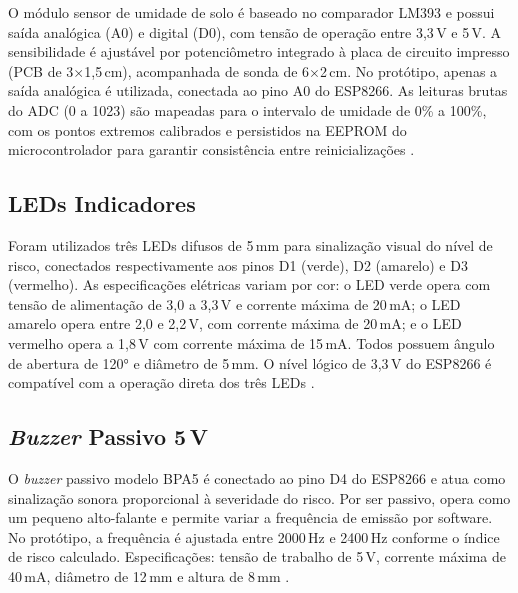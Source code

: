 O módulo sensor de umidade de solo é baseado no comparador LM393 e
possui saída analógica (A0) e digital (D0), com tensão de operação
entre 3,3\,V e 5\,V. A sensibilidade é ajustável por potenciômetro
integrado à placa de circuito impresso (PCB de 3$\times$1,5\,cm),
acompanhada de sonda de 6$\times$2\,cm. No protótipo, apenas a saída
analógica é utilizada, conectada ao pino A0 do ESP8266. As leituras
brutas do ADC (0 a 1023) são mapeadas para o intervalo de umidade de
0\% a 100\%, com os pontos extremos calibrados e persistidos na EEPROM
do microcontrolador para garantir consistência entre reinicializações
\cite{eletrogate_higrometro}.

\subsection{LEDs Indicadores}
\label{subsec:leds}

Foram utilizados três LEDs difusos de 5\,mm para sinalização visual
do nível de risco, conectados respectivamente aos pinos D1 (verde),
D2 (amarelo) e D3 (vermelho). As especificações elétricas variam por
cor: o LED verde opera com tensão de alimentação de 3,0 a 3,3\,V e
corrente máxima de 20\,mA; o LED amarelo opera entre 2,0 e 2,2\,V,
com corrente máxima de 20\,mA; e o LED vermelho opera a 1,8\,V com
corrente máxima de 15\,mA. Todos possuem ângulo de abertura de 120°
e diâmetro de 5\,mm. O nível lógico de 3,3\,V do ESP8266 é
compatível com a operação direta dos três LEDs
\cite{usinainfo_led_amarelo,usinainfo_led_vermelho}.

\subsection{\textit{Buzzer} Passivo 5\,V}
\label{subsec:buzzer}

O \textit{buzzer} passivo modelo BPA5 é conectado ao pino D4 do
ESP8266 e atua como sinalização sonora proporcional à severidade do
risco. Por ser passivo, opera como um pequeno alto-falante e permite
variar a frequência de emissão por software. No protótipo, a
frequência é ajustada entre 2000\,Hz e 2400\,Hz conforme o índice
de risco calculado. Especificações: tensão de trabalho de 5\,V,
corrente máxima de 40\,mA, diâmetro de 12\,mm e altura de 8\,mm
\cite{usinainfo_buzzer}.

